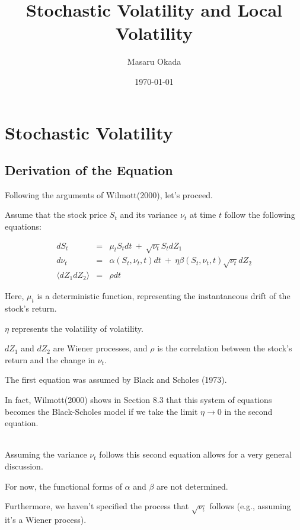 \documentclass[uplatex,a4j,12pt,dvipdfmx]{jsarticle}
\title{
Stochastic Volatility and Local Volatility
}
\author{Masaru Okada}
\date{\today}
\begin{document}
\maketitle

\section{Stochastic Volatility}

\subsection{Derivation of the Equation}

Following the arguments of Wilmott(2000), let's proceed.

Assume that the stock price $S_{t}$ and its variance $\nu_{t}$ at time $t$ follow the following equations:

\begin{eqnarray*}
	dS_{t}
	&=&
	\mu_{t} S_{t} dt
	\ + \
	\sqrt{\nu_{t}} S_{t} dZ_{1}
	\\
	d \nu_{t}
	&=&
	\alpha(S_{t},\nu_{t},t) dt
	\ + \
	\eta \beta(S_{t},\nu_{t},t) \sqrt{\nu_{t}} dZ_{2}
	\\
	\langle
	dZ_{1} dZ_{2}
	\rangle
	&=&
	\rho dt
\end{eqnarray*}

Here, $\mu_{t}$ is a deterministic function, representing the instantaneous drift of the stock's return.

$\eta$ represents the volatility of volatility.

$dZ_{1}$ and $dZ_{2}$ are Wiener processes, and $\rho$ is the correlation between the stock's return and the change in $\nu_{t}$.

The first equation was assumed by Black and Scholes (1973).

In fact, Wilmott(2000) shows in Section 8.3 that this system of equations becomes the Black-Scholes model if we take the limit $\eta \to 0$ in the second equation.

\ \\

Assuming the variance $\nu_{t}$ follows this second equation allows for a very general discussion.

For now, the functional forms of $\alpha$ and $\beta$ are not determined.

Furthermore, we haven't specified the process that $\sqrt{\nu_{t}}$ follows (e.g., assuming it's a Wiener process).
\end{document}
